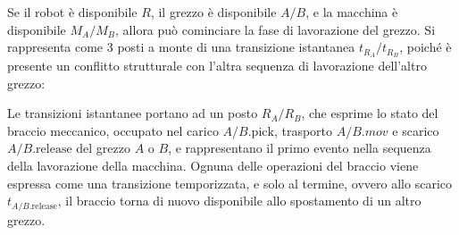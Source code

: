 \documentclass{article}
\numberwithin{equation}{subsection}
\begin{document}
Se il robot è disponibile $R$, il grezzo è disponibile $A/B$, e la macchina è disponibile $M_A/M_B$, allora può cominciare la fase di lavorazione del grezzo. Si rappresenta 
come $3$ posti a monte di una transizione istantanea $t_{R_A}/t_{R_B}$, poiché è presente un conflitto strutturale con l'altra sequenza di lavorazione dell'altro grezzo:
\begin{center}
\end{center}
Le transizioni istantanee portano ad un posto $R_A/R_B$, che esprime lo stato del braccio meccanico, occupato nel carico $A/B.\mathrm{pick}$, trasporto $A/B.mov$ e scarico $A/B.\mathrm{release}$ 
del grezzo $A$ o $B$, e rappresentano il primo evento nella sequenza della lavorazione della macchina. Ognuna delle operazioni del braccio viene espressa come una transizione 
temporizzata, e solo al termine, ovvero allo scarico $t_{A/B.\mathrm{release}}$, il braccio torna di nuovo disponibile allo spostamento di un altro grezzo. 
\end{document}
